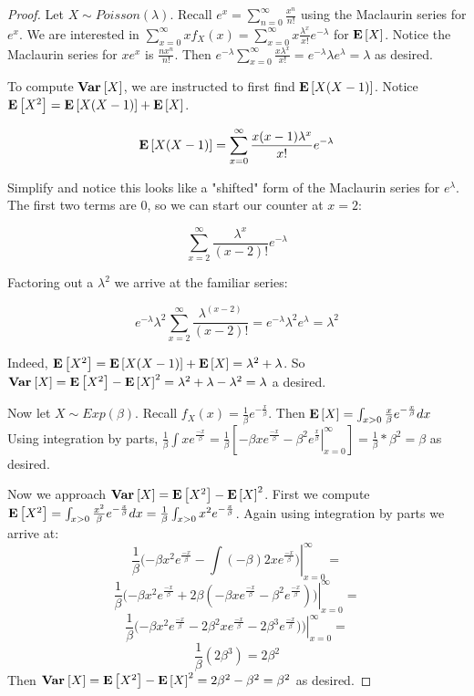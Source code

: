 \documentclass[10pt]{article}
\begin{document}
\begin{proof}
    Let $X \sim Poisson(\lambda)$. Recall $e^{x} = \sum_{n=0}^{\infty}
    \frac{x^n}{n!}$ using the Maclaurin series for $e^{x}$. We are interested
    in $\sum_{x=0}^{\infty} x f_X(x) = \sum_{x=0}^{\infty} x
    \frac{\lambda^x}{x!} e^{-\lambda}$ for $\operatorname{\mathbf{E}}\left[X\right]$. Notice the Maclaurin series for
    $xe^{x}$ is $\frac{nx^n}{n!}$. Then $ e^{-\lambda} \sum_{x=0}^{\infty}
    \frac{x\lambda^x}{x!} = e^{-\lambda}\lambda e^{\lambda} = \lambda$ as
    desired.

    To compute $\operatorname{\mathbf{Var}}_{}\left[X\right]$, we are instructed to first find $\operatorname{\mathbf{E}}\left[X(X-1)\right]$. Notice
    $\operatorname{\mathbf{E}}\left[X^2\right] = \operatorname{\mathbf{E}}\left[X(X-1)\right] + \operatorname{\mathbf{E}}\left[X\right]$.

    \[\operatorname{\mathbf{E}}\left[X(X-1)\right] = \sum_{x=0}^{\infty} \frac{x(x-1)\lambda^x}{x!} e^{-\lambda}\]

    Simplify and notice this looks like a "shifted" form of the Maclaurin
    series for $e^{\lambda}$. The first two terms are 0, so we can start our
    counter at $x=2$:

    \[\sum_{x=2}^{\infty} \frac{\lambda^x}{(x-2)!} e^{-\lambda}\]

    Factoring out a $\lambda^2$ we arrive at the familiar series:

    \[e^{-\lambda} \lambda^2 \sum_{x=2}^{\infty} \frac{\lambda^{(x-2)}}{(x-2)!}
= e^{-\lambda}\lambda^2 e^\lambda = \lambda^2\]

    Indeed, $\operatorname{\mathbf{E}}\left[X^2\right] = \operatorname{\mathbf{E}}\left[X(X-1)\right] + \operatorname{\mathbf{E}}\left[X\right] = \lambda^2 + \lambda$. So $\operatorname{\mathbf{Var}}_{}\left[X\right] =
    \operatorname{\mathbf{E}}\left[X^2\right] - \operatorname{\mathbf{E}}\left[X\right]^2 = \lambda^2 + \lambda - \lambda^2 = \lambda$ a desired.

    Now let $X \sim Exp(\beta)$. Recall $f_X(x) =
    \frac{1}{\beta}e^{-\frac{x}{\beta}}$. Then $\operatorname{\mathbf{E}}\left[X\right] = \int_{x > 0}
    \frac{x}{\beta}e^{-\frac{x}{\beta}} dx$ Using integration by parts,
    $\frac{1}{\beta} \int xe^{\frac{-x}{\beta}} = \frac{1}{\beta} [\left. -\beta x
        e^{\frac{-x}{\beta}} - \beta^2 e^{\frac{x}{\beta}} \right|_{x=0}^{\infty} ] =
    \frac{1}{\beta} * \beta^2 = \beta$ as desired.

    Now we approach $\operatorname{\mathbf{Var}}_{}\left[X\right] = \operatorname{\mathbf{E}}\left[X^2\right] - \operatorname{\mathbf{E}}\left[X\right]^2$. First we compute $\operatorname{\mathbf{E}}\left[X^2\right] =
    \int_{x > 0} \frac{x^2}{\beta}e^{-\frac{x}{\beta}} dx = \frac{1}{\beta}\int_{x > 0} x^2e^{-\frac{x}{\beta}}$.
    Again using integration by parts we arrive at: 
    \[\frac{1}{\beta}(\left. -\beta x^2 e^{\frac{-x}{\beta}} - \int (-\beta) 2x
        e^{\frac{-x}{\beta}})\right|_{x=0}^{\infty} = \]
    \[\frac{1}{\beta}(\left. -\beta x^2 e^{\frac{-x}{\beta}} +2\beta(-\beta x e^{\frac{-x}{\beta}} - \beta^2 e^{\frac{-x}{\beta}})) \right|_{x=0}^{\infty} = \]
    \[\frac{1}{\beta}(\left. -\beta x^2 e^{\frac{-x}{\beta}} - 2\beta^2 x
        e^{\frac{-x}{\beta}} - 2\beta^3 e^{\frac{-x}{\beta}})) \right|_{x=0}^{\infty} = \]
        \[\frac{1}{\beta}(2\beta^3) = 2\beta^2\]
        Then $\operatorname{\mathbf{Var}}_{}\left[X\right] = \operatorname{\mathbf{E}}\left[X^2\right] - \operatorname{\mathbf{E}}\left[X\right]^2 = 2\beta^2 - \beta^2 = \beta^2$ as
        desired.
\end{proof}
\end{document}
